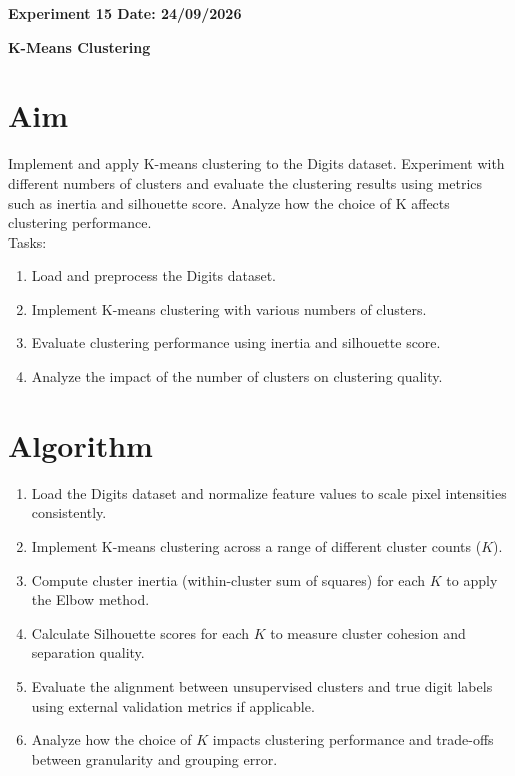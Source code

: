 \documentclass[12pt, a4paper]{report}
\begin{document}
\newpage 
\begin{center}
	\bfseries 
	Experiment 15 \hfill Date:  24/09/2026
\end{center}


\begin{center}
	{\bfseries \Huge K-Means Clustering}	
\end{center}

\section*{Aim} 
Implement and apply K-means clustering to the Digits dataset. Experiment with different numbers of clusters and
evaluate the clustering results using metrics such as inertia and silhouette score. Analyze how the choice of K
affects clustering performance.\\
Tasks:
\begin{enumerate}[\quad -]
	\itemsep 0em 
	
	\item Load and preprocess the Digits dataset.
	\item Implement K-means clustering with various numbers of clusters.
	\item Evaluate clustering performance using inertia and silhouette score.
	\item Analyze the impact of the number of clusters on clustering quality.
\end{enumerate}


\section*{Algorithm} 
\begin{enumerate}
	\item Load the Digits dataset and normalize feature values to scale pixel intensities consistently.
	\item Implement K-means clustering across a range of different cluster counts ($K$).
	\item Compute cluster inertia (within-cluster sum of squares) for each $K$ to apply the Elbow method.
	\item Calculate Silhouette scores for each $K$ to measure cluster cohesion and separation quality.
	\item Evaluate the alignment between unsupervised clusters and true digit labels using external validation metrics if applicable.
	\item Analyze how the choice of $K$ impacts clustering performance and trade-offs between granularity and grouping error.
\end{enumerate}
\end{document}
